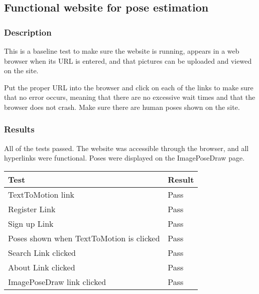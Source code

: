 \documentclass{scrreprt}
\begin{document}
\subsection{Functional website for pose estimation}

\subsubsection{Description}

This is a baseline test to make sure the website is running, appears in a web
browser when its URL is entered, and that pictures can be uploaded and
viewed on the site.

Put the proper URL into the browser and click on each of the links to make sure
that no error occurs, meaning that there are no excessive wait times and that
the browser does not crash. Make sure there are human poses shown on the site.

\subsubsection{Results}

All of the tests passed. The website was accessible through the browser, and
all hyperlinks were functional. Poses were displayed on the ImagePoseDraw page.

\begin{table}[H]
        \centering
        \begin{tabular}{||p{5cm}|p{2.5cm}||}
                \hline
                \textbf Test & \textbf Result\\
                \hline\hline
                TextToMotion link & Pass  \\
                \hline
                Register Link & Pass  \\
                \hline
                Sign up Link & Pass  \\
                \hline
                Poses shown when TextToMotion is clicked & Pass  \\
                \hline
                Search Link clicked & Pass  \\
                \hline
                About Link clicked & Pass  \\
                \hline
                ImagePoseDraw link clicked & Pass  \\
                \hline
        \end{tabular}
\end{table}
\end{document}
